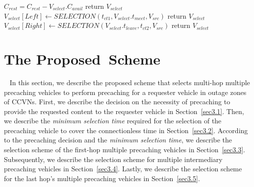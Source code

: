 \documentclass[electronics,aricle,accept,pdftex,moreauthors]{Definitions/mdpi}
\begin{document}
    
    
\begin{algorithm}[H]    
\addtocounter{algorithm}{-1}
\caption{\emph{Cont.}}

    \label{alg_cmfa}
\begin{algorithmic}[1]
    
            \State $C_{rest} = C_{rest}-V_{select}.C_{avail}$
                \State return $V_{select}$
            \EndIf
                \State $V_{select}[Left]\leftarrow SELECTION(t_{ct1}, V_{select}.t_{meet}, V_{src})$
            \EndIf
                \State return $V_{select}$
            \EndIf
                \State $V_{select}[Right]\leftarrow SELECTION(V_{select}.t_{leave}, t_{ct2}, V_{src})$
            \EndIf
            \State return $V_{select}$
    \end{algorithmic}
\end{algorithm}




\section{The Proposed~Scheme}~\label{sec3}
In this section, we describe the proposed scheme that selects multi-hop multiple precaching vehicles to perform precaching for a requester vehicle in outage zones of CCVNs.
First, we describe the decision on the necessity of precaching to provide the requested content to the requester vehicle in Section~\ref{sec3.1}.
Then, we describe the \textit{minimum selection time} required for the selection of the precaching vehicle to cover the connectionless time in Section~\ref{sec3.2}.
According to the precaching decision and the \textit{minimum selection time}, we describe the selection scheme of the first-hop multiple precaching vehicles in Section~\ref{sec3.3}.
Subsequently, we describe the selection scheme for multiple intermediary precaching vehicles in Section~\ref{sec3.4}.
Lastly, we describe the selection scheme for the last hop's multiple precaching vehicles in Section~\ref{sec3.5}.
\end{document}

